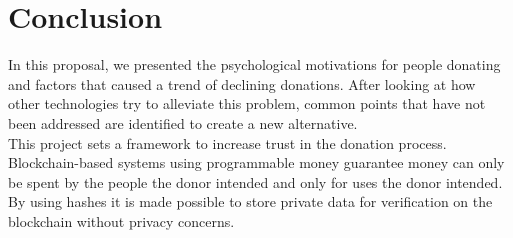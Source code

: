 \chapter{Conclusion}
In this proposal, we presented the psychological motivations for people donating and factors that caused a trend of declining donations. After looking at how other technologies try to alleviate this problem, common points that have not been addressed are identified to create a new alternative.\\
This project sets a framework to increase trust in the donation process. Blockchain-based systems using programmable money guarantee money can only be spent by the people the donor intended and only for uses the donor intended. By using hashes it is made possible to store private data for verification on the blockchain without privacy concerns.